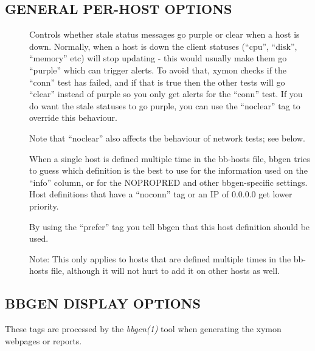 \subsection{GENERAL PER-HOST OPTIONS }
\begin{description}
\item[] Controls whether stale status messages go purple or
  clear when a host is down. Normally, when a host is down the client
  statuses (``cpu'', ``disk'', ``memory'' etc) will stop updating -
  this would usually make them go ``purple'' which can trigger
  alerts. To avoid that, xymon checks if the ``conn'' test has
  failed, and if that is true then the other tests will go ``clear''
  instead of purple so you only get alerts for the ``conn'' test. If
  you do want the stale statuses to go purple, you can use the
  ``noclear'' tag to override this behaviour. 


  Note that ``noclear'' also affects the behaviour of network tests; see below. 


 

\item[] When a single host is defined multiple time in the
  bb-hosts file, bbgen tries to guess which definition is the best to
  use for the information used on the ``info'' column, or for the
  NOPROPRED and other bbgen-specific settings. Host definitions that
  have a ``noconn'' tag or an IP of 0.0.0.0 get lower priority. 


  By using the ``prefer'' tag you tell bbgen that this host definition should be used. 


  Note: This only applies to hosts that are defined multiple times in
  the bb-hosts file, although it will not hurt to add it on other
  hosts as well. 



 
\end{description}
\subsection{BBGEN DISPLAY OPTIONS}
 These tags are processed by the \emph{bbgen(1)}
 tool when generating the xymon webpages or reports. 

